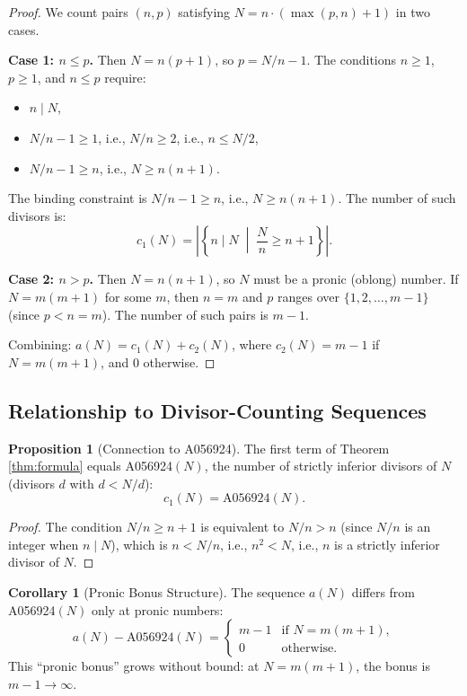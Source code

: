 \documentclass[11pt,a4paper]{article}
\theoremstyle{definition}
\newtheorem{proposition}{Proposition}[section]
\newtheorem{corollary}{Corollary}[section]
\begin{document}
\begin{proof}
We count pairs $(n, p)$ satisfying $N = n \cdot (\max(p, n) + 1)$ in two cases.

\textbf{Case 1: $n \leq p$.} Then $N = n(p+1)$, so $p = N/n - 1$. The conditions $n \geq 1$, $p \geq 1$, and $n \leq p$ require:
\begin{itemize}
\item $n \mid N$,
\item $N/n - 1 \geq 1$, i.e., $N/n \geq 2$, i.e., $n \leq N/2$,
\item $N/n - 1 \geq n$, i.e., $N \geq n(n+1)$.
\end{itemize}
The binding constraint is $N/n - 1 \geq n$, i.e., $N \geq n(n+1)$. The number of such divisors is:
\[
c_1(N) = \left| \left\{ n \mid N \;\middle|\; \frac{N}{n} \geq n + 1 \right\} \right|.
\]

\textbf{Case 2: $n > p$.} Then $N = n(n+1)$, so $N$ must be a pronic (oblong) number. If $N = m(m+1)$ for some $m$, then $n = m$ and $p$ ranges over $\{1, 2, \ldots, m-1\}$ (since $p < n = m$). The number of such pairs is $m - 1$.

Combining: $a(N) = c_1(N) + c_2(N)$, where $c_2(N) = m - 1$ if $N = m(m+1)$, and $0$ otherwise.
\end{proof}

\subsection{Relationship to Divisor-Counting Sequences}

\begin{proposition}[Connection to A056924]
\label{prop:A056924}
The first term of Theorem \ref{thm:formula} equals A056924$(N)$, the number of strictly inferior divisors of $N$ (divisors $d$ with $d < N/d$):
\[
c_1(N) = \mathrm{A056924}(N).
\]
\end{proposition}

\begin{proof}
The condition $N/n \geq n + 1$ is equivalent to $N/n > n$ (since $N/n$ is an integer when $n \mid N$), which is $n < N/n$, i.e., $n^2 < N$, i.e., $n$ is a strictly inferior divisor of $N$.
\end{proof}

\begin{corollary}[Pronic Bonus Structure]
\label{cor:pronic}
The sequence $a(N)$ differs from A056924$(N)$ only at pronic numbers:
\[
a(N) - \mathrm{A056924}(N) = \begin{cases} m - 1 & \text{if } N = m(m+1), \\ 0 & \text{otherwise.} \end{cases}
\]
This ``pronic bonus'' grows without bound: at $N = m(m+1)$, the bonus is $m - 1 \to \infty$.
\end{corollary}
\end{document}
